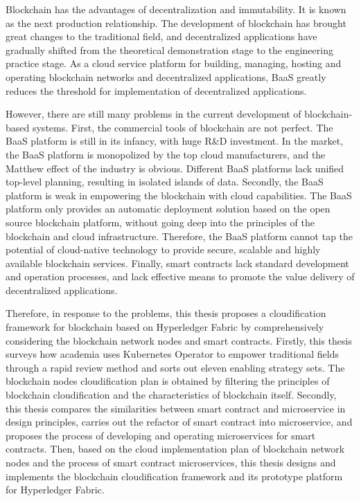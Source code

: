 \documentclass[macfonts,master,twoside]{njuthesis}
\begin{document}
\begin{englishabstract}
  Blockchain has the advantages of decentralization and immutability. It is known as the next production relationship. The development of blockchain has brought great changes to the traditional field, and decentralized applications have gradually shifted from the theoretical demonstration stage to the engineering practice stage. As a cloud service platform for building, managing, hosting and operating blockchain networks and decentralized applications, BaaS greatly reduces the threshold for implementation of decentralized applications.

  However, there are still many problems in the current development of blockchain-based systems. First, the commercial tools of blockchain are not perfect. The BaaS platform is still in its infancy, with huge R\&D investment. In the market, the BaaS platform is monopolized by the top cloud manufacturers, and the Matthew effect of the industry is obvious. Different BaaS platforms lack unified top-level planning, resulting in isolated islands of data. Secondly, the BaaS platform is weak in empowering the blockchain with cloud capabilities. The BaaS platform only provides an automatic deployment solution based on the open source blockchain platform, without going deep into the principles of the blockchain and cloud infrastructure. Therefore, the BaaS platform cannot tap the potential of cloud-native technology to provide secure, scalable and highly available blockchain services. Finally, smart contracts lack standard development and operation processes, and lack effective means to promote the value delivery of decentralized applications.

  Therefore, in response to the problems, this thesis proposes a cloudification framework for blockchain based on Hyperledger Fabric by comprehensively considering the blockchain network nodes and smart contracts. Firstly, this thesis surveys how academia uses Kubernetes Operator to empower traditional fields through a rapid review method and sorts out eleven enabling strategy sets. The blockchain nodes cloudification plan is obtained by filtering the principles of blockchain cloudification and the characteristics of blockchain itself. Secondly, this thesis compares the similarities between smart contract and microservice in design principles, carries out the refactor of smart contract into microservice, and proposes the process of developing and operating microservices for smart contracts. Then, based on the cloud implementation plan of blockchain network nodes and the process of smart contract microservices, this thesis designs and implements the blockchain cloudification framework and its prototype platform for Hyperledger Fabric.


\end{englishabstract}
\end{document}
